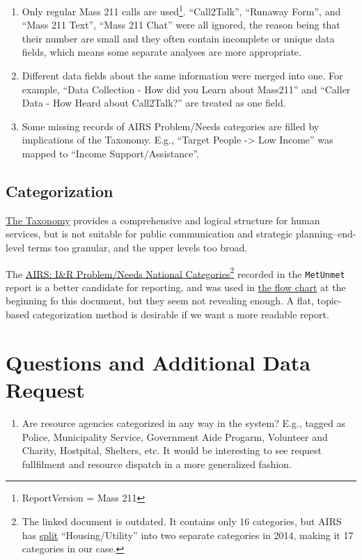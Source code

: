 \documentclass[]{tufte-handout}
\providecommand{\tightlist}{%
  \setlength{\itemsep}{0pt}\setlength{\parskip}{0pt}}
\begin{document}
\begin{enumerate}
\def\labelenumi{\arabic{enumi}.}
\tightlist
\item
  Only regular Mass 211 calls are used\footnote{ReportVersion = Mass 211}.
  ``Call2Talk'', ``Runaway Form'', and ``Mass 211 Text'', ``Mass 211
  Chat'' were all ignored, the reason being that their number are small
  and they often contain incomplete or unique data fields, which means
  some separate analyses are more appropriate.
\item
  Different data fields about the same information were merged into one.
  For example, ``Data Collection - How did you Learn about Mass211'' and
  ``Caller Data - How Heard about Call2Talk?'' are treated as one field.
\item
  Some missing records of AIRS Problem/Needs categories are filled by
  implications of the Taxonomy. E.g., ``Target People -\textgreater{}
  Low Income'' was mapped to ``Income Support/Assistance''.
\end{enumerate}

\subsection{Categorization}\label{categorization}

\href{http://www.airs.org/i4a/pages/index.cfm?pageid=3386}{The Taxonomy}
provides a comprehensive and logical structure for human services, but
is not suitable for public communication and strategic
planning--end-level terms too granular, and the upper levels too broad.

The
\href{https://www.acallforhelp.info/cms6/files/os007/p46/AIRS\%20ProblemNeeds\%20definitions\%202012.pdf}{AIRS:
I\&R Problem/Needs National Categories}\footnote{The linked document is
  outdated. It contains only 16 categories, but AIRS has
  \href{http://www.icarol.com/changes-to-airs-problemsneeds-categories/}{split}
  ``Housing/Utility'' into two separate categories in 2014, making it 17
  categories in our case.} recorded in the \texttt{MetUnmet} report is a
better candidate for reporting, and was used in
\protect\hyperlink{the-flow}{the flow chart} at the beginning fo this
document, but they seem not revealing enough. A flat, topic-based
categorization method is desirable if we want a more readable report.

\section{Questions and Additional Data
Request}\label{questions-and-additional-data-request}

\begin{enumerate}
\def\labelenumi{\arabic{enumi}.}
\tightlist
\item
  Are resource agencies categorized in any way in the system? E.g.,
  tagged as Police, Municipality Service, Government Aide Progarm,
  Volunteer and Charity, Hostpital, Shelters, etc. It would be
  interesting to see request fullfilment and resource dispatch in a more
  generalized fashion.
\end{enumerate}


\end{document}
